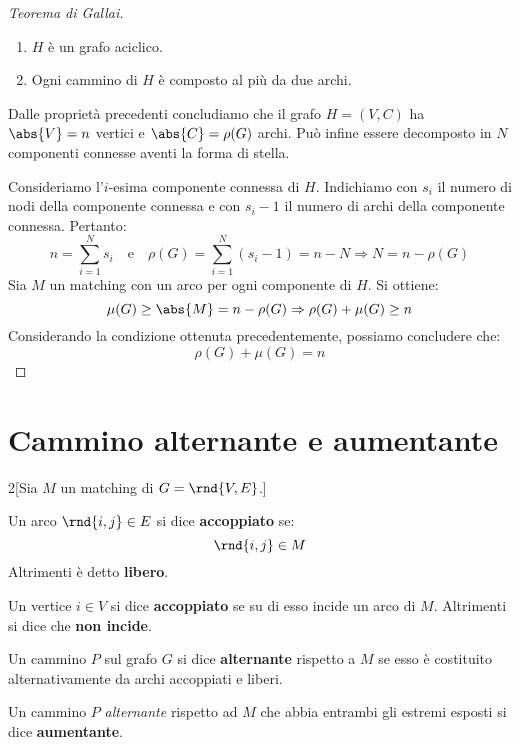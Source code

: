 \documentclass[\main/main.tex]{subfiles}
\begin{document}
\begin{proof}[Teorema di Gallai]
	\begin{enumerate}
		\item \(H\) è un grafo aciclico.
		\item Ogni cammino di \(H\) è composto al più da due archi.
	\end{enumerate}

	Dalle proprietà precedenti concludiamo che il grafo \(H = (V, C)\) ha \(\abs{V} = n\) vertici e \(\abs{C} = \rho(G)\) archi. Può infine essere decomposto in \(N\) componenti connesse aventi la forma di stella.

	Consideriamo l'\(i\)-esima componente connessa di \(H\). Indichiamo con \(s_i\) il numero di nodi della componente connessa e con \(s_i-1\) il numero di archi della componente connessa. Pertanto:
	\[
		n = \sum_{i=1}^N s_i \quad \text{e} \quad \rho(G) = \sum_{i=1}^N (s_i -1) = n - N \Rightarrow N = n - \rho(G)
	\]
	Sia \(M\) un matching con un arco per ogni componente di \(H\). Si ottiene:
	\[
		\mu(G) \geq \abs{M} = n - \rho(G) \Rightarrow \rho(G) + \mu(G) \geq n
	\]
	Considerando la condizione ottenuta precedentemente, possiamo concludere che:
	\[
		\rho(G) + \mu(G) = n
	\]

\end{proof}
\clearpage
\section{Cammino alternante e aumentante}
\begin{multicols}{2}[Sia \(M\) un matching di \(G = \rnd{V, E}\).]
	\begin{definition}
		Un arco \(\rnd{i,j} \in E\) si dice \textbf{accoppiato} se:
		\[
			\rnd{i,j} \in M
		\]
		Altrimenti è detto \textbf{libero}.
	\end{definition}
	\begin{definition}
		Un vertice \(i \in V\) si dice \textbf{accoppiato} se su di esso incide un arco di \(M\). Altrimenti si dice che \textbf{non incide}.
	\end{definition}
	\begin{definition}
		Un cammino \(P\) sul grafo \(G\) si dice \textbf{alternante} rispetto a \(M\) se esso è costituito alternativamente da archi accoppiati e liberi.
	\end{definition}
	\begin{definition}
		Un cammino \(P\) \textit{alternante} rispetto ad \(M\) che abbia entrambi gli estremi esposti si dice \textbf{aumentante}.
	\end{definition}
\end{multicols}
\end{document}
